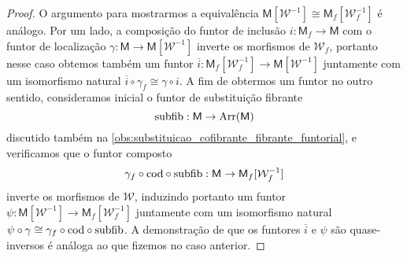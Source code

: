 \begin{proof}
  O argumento para mostrarmos a equivalência $\mathsf{M}[\mathcal{W}^{-1}] \cong \mathsf{M}_{f}[\mathcal{W}^{-1}_{f}]$ é análogo.
  Por um lado, a composição do funtor de inclusão $i: \mathsf{M}_{f} \to \mathsf{M}$ com o funtor de localização $\gamma: \mathsf{M} \to \mathsf{M}[\mathcal{W}^{-1}]$ inverte os morfismos de $\mathcal{W}_{f}$, portanto nesse caso obtemos também um funtor $\overline{i}: \mathsf{M}_{f}[\mathcal{W}_{f}^{-1}] \to \mathsf{M}[\mathcal{W}^{-1}]$ juntamente com um isomorfismo natural $\overline{i} \circ \gamma_{f} \cong \gamma \circ i$.
  A fim de obtermos um funtor no outro sentido, consideramos inicial o funtor de substituição fibrante
  \begin{displaymath}
    \mathrm{subfib}: \mathsf{M} \to \mathrm{Arr}(\mathsf{M})
  \end{displaymath}
  discutido também na \cref{obs:substituicao_cofibrante_fibrante_funtorial}, e verificamos que o funtor composto
  \begin{displaymath}
    \gamma_{f} \circ \mathrm{cod} \circ \mathrm{subfib}: \mathsf{M} \to \mathsf{M}_{f}[\mathcal{W}_{f}^{-1}]
  \end{displaymath}
  inverte os morfismos de $\mathcal{W}$, induzindo portanto um funtor $\psi: \mathsf{M}[\mathcal{W}^{-1}] \to \mathsf{M}_{f}[\mathcal{W}_{f}^{-1}]$ juntamente com um isomorfismo natural $\psi \circ \gamma \cong \gamma_{f} \circ \mathrm{cod} \circ \mathrm{subfib}$.
  A demonstração de que os funtores $\overline{i}$ e $\psi$ são quase-inversos é análoga ao que fizemos no caso anterior.


\end{proof}
